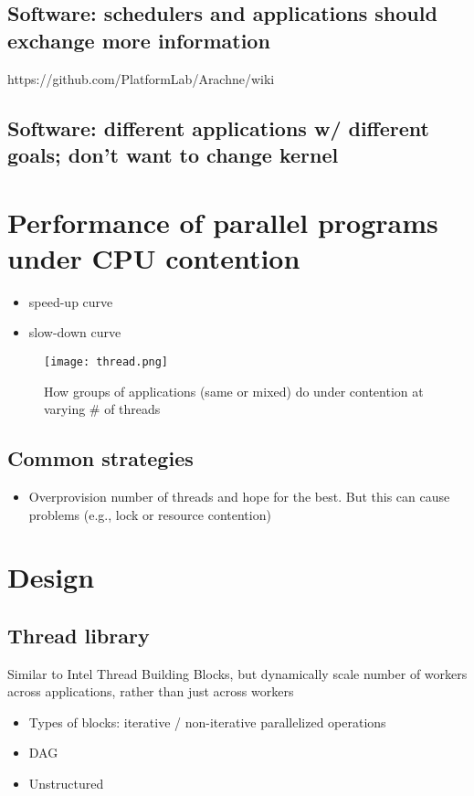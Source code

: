 \documentclass[10pt,preprint]{sigplanconf}
\begin{document}
\subsection{Software: schedulers and applications should exchange more information}
https://github.com/PlatformLab/Arachne/wiki

\subsection{Software: different applications w/ different goals; don't want to change kernel}

\section{Performance of parallel programs under CPU contention}

\begin{itemize}
  \item speed-up curve
  \item slow-down curve
\end{itemize}

\begin{figure}
\centering
  \texttt{[image: thread.png]}
  \caption{How groups of applications (same or mixed) do under contention at varying \# of threads}
\end{figure}

\subsection{Common strategies}
\begin{itemize}
  \item Overprovision number of threads and hope for the best. But this can cause problems (e.g., lock or resource contention)
\end{itemize}

\section{Design}
\subsection{Thread library}
Similar to Intel Thread Building Blocks, but dynamically scale number of workers across applications, rather than just across workers
\begin{itemize}
  \item Types of blocks: iterative / non-iterative parallelized operations
  \item DAG
  \item Unstructured
\end{itemize}
\end{document}
